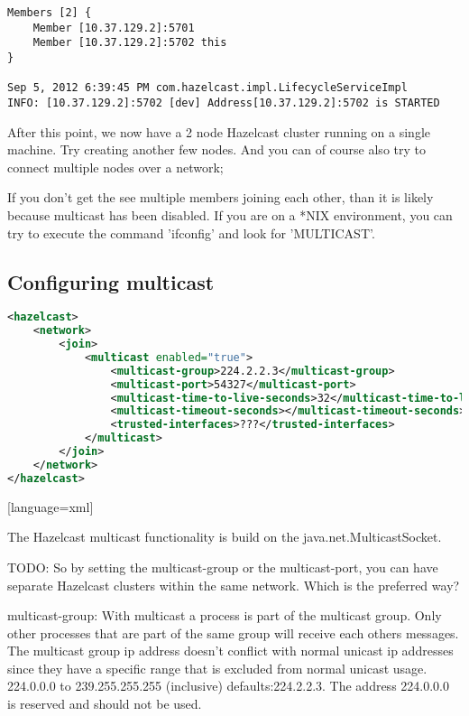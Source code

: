 \begin{verbatim}
Members [2] {
    Member [10.37.129.2]:5701
    Member [10.37.129.2]:5702 this
}

Sep 5, 2012 6:39:45 PM com.hazelcast.impl.LifecycleServiceImpl
INFO: [10.37.129.2]:5702 [dev] Address[10.37.129.2]:5702 is STARTED
\end{verbatim}		

After this point, we now have a 2 node Hazelcast cluster running on a single machine. Try creating another few nodes. And you can of course also try to connect multiple nodes over a network;

If you don't get the see multiple members joining each other, than it is likely because multicast has been disabled. If you are on a *NIX environment, you can try to execute the command 'ifconfig' and look for 'MULTICAST'. 

\subsection{Configuring multicast}

\begin{lstlisting}[language=xml]
<hazelcast>
    <network>
        <join>
            <multicast enabled="true">
                <multicast-group>224.2.2.3</multicast-group>
                <multicast-port>54327</multicast-port>
                <multicast-time-to-live-seconds>32</multicast-time-to-live-seconds>
                <multicast-timeout-seconds></multicast-timeout-seconds>
                <trusted-interfaces>???</trusted-interfaces>
            </multicast>
        </join>
    </network>
</hazelcast>
\end{lstlisting}[language=xml]

The Hazelcast multicast functionality is build on the java.net.MulticastSocket.

TODO: So by setting the multicast-group or the multicast-port, you can have separate Hazelcast clusters within the same network. Which is the preferred way?

multicast-group:
With multicast a process is part of the multicast group. Only other processes that are part of the same group will receive each others messages. The multicast group ip address doesn't conflict with normal unicast ip addresses since they have a specific range that is excluded from normal unicast usage. 224.0.0.0 to 239.255.255.255 (inclusive)
defaults:224.2.2.3. The address 224.0.0.0 is reserved and should not be used.

